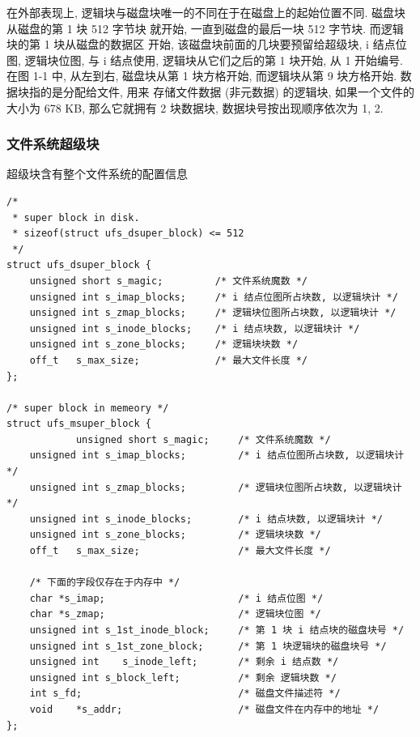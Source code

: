 \documentclass[nofonts]{ctexart}
\begin{document}
在外部表现上, 逻辑块与磁盘块唯一的不同在于在磁盘上的起始位置不同.
磁盘块从磁盘的第 1 块 512 字节块 就开始, 一直到磁盘的最后一块 512
字节块. 而逻辑块的第 1 块从磁盘的数据区 开始,
该磁盘块前面的几块要预留给超级块, i 结点位图, 逻辑块位图, 与 i 结点使用,
逻辑块从它们之后的第 1 块开始, 从 1 开始编号. 在图 1-1 中, 从左到右,
磁盘块从第 1 块方格开始, 而逻辑块从第 9 块方格开始.
数据块指的是分配给文件, 用来 存储文件数据 (非元数据) 的逻辑块,
如果一个文件的大小为 678 KB, 那么它就拥有 2 块数据块,
数据块号按出现顺序依次为 1, 2.

\subsubsection{文件系统超级块}\label{ux6587ux4ef6ux7cfbux7edfux8d85ux7ea7ux5757}

超级块含有整个文件系统的配置信息

\begin{verbatim}
/*
 * super block in disk.
 * sizeof(struct ufs_dsuper_block) <= 512
 */
struct ufs_dsuper_block {
    unsigned short s_magic;         /* 文件系统魔数 */
    unsigned int s_imap_blocks;     /* i 结点位图所占块数, 以逻辑块计 */
    unsigned int s_zmap_blocks;     /* 逻辑块位图所占块数, 以逻辑块计 */
    unsigned int s_inode_blocks;    /* i 结点块数, 以逻辑块计 */
    unsigned int s_zone_blocks;     /* 逻辑块块数 */
    off_t   s_max_size;             /* 最大文件长度 */
};

/* super block in memeory */
struct ufs_msuper_block {
            unsigned short s_magic;     /* 文件系统魔数 */
    unsigned int s_imap_blocks;         /* i 结点位图所占块数, 以逻辑块计 */
    unsigned int s_zmap_blocks;         /* 逻辑块位图所占块数, 以逻辑块计 */
    unsigned int s_inode_blocks;        /* i 结点块数, 以逻辑块计 */
    unsigned int s_zone_blocks;         /* 逻辑块块数 */
    off_t   s_max_size;                 /* 最大文件长度 */

    /* 下面的字段仅存在于内存中 */
    char *s_imap;                       /* i 结点位图 */
    char *s_zmap;                       /* 逻辑块位图 */
    unsigned int s_1st_inode_block;     /* 第 1 块 i 结点块的磁盘块号 */
    unsigned int s_1st_zone_block;      /* 第 1 块逻辑块的磁盘块号 */
    unsigned int    s_inode_left;       /* 剩余 i 结点数 */
    unsigned int s_block_left;          /* 剩余 逻辑块数 */
    int s_fd;                           /* 磁盘文件描述符 */
    void    *s_addr;                    /* 磁盘文件在内存中的地址 */
};
\end{verbatim}
\end{document}

